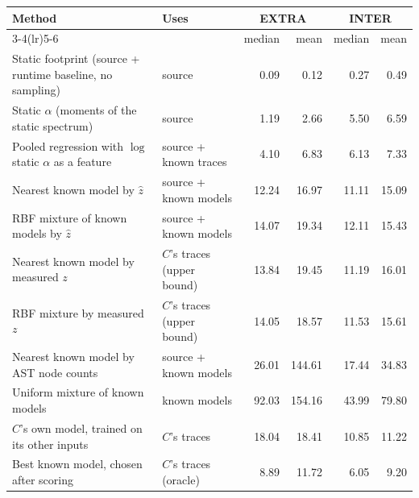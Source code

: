 \begin{tabular}{llrrrr}
\toprule
Method & Uses & \multicolumn{2}{c}{EXTRA} & \multicolumn{2}{c}{INTER} \\
\cmidrule(lr){3-4}\cmidrule(lr){5-6}
 & & median & mean & median & mean \\
\midrule
Static footprint (source + runtime baseline, no sampling) & source & 0.09 & 0.12 & 0.27 & 0.49 \\
Static $\alpha$ (moments of the static spectrum) & source & 1.19 & 2.66 & 5.50 & 6.59 \\
Pooled regression with $\log$ static $\alpha$ as a feature & source + known traces & 4.10 & 6.83 & 6.13 & 7.33 \\
\addlinespace
Nearest known model by $\hat z$ & source + known models & 12.24 & 16.97 & 11.11 & 15.09 \\
RBF mixture of known models by $\hat z$ & source + known models & 14.07 & 19.34 & 12.11 & 15.43 \\
Nearest known model by measured $z$ & $C$'s traces (upper bound) & 13.84 & 19.45 & 11.19 & 16.01 \\
RBF mixture by measured $z$ & $C$'s traces (upper bound) & 14.05 & 18.57 & 11.53 & 15.61 \\
Nearest known model by AST node counts & source + known models & 26.01 & 144.61 & 17.44 & 34.83 \\
\addlinespace
Uniform mixture of known models & known models & 92.03 & 154.16 & 43.99 & 79.80 \\
\addlinespace
$C$'s own model, trained on its other inputs & $C$'s traces & 18.04 & 18.41 & 10.85 & 11.22 \\
Best known model, chosen after scoring & $C$'s traces (oracle) & 8.89 & 11.72 & 6.05 & 9.20 \\
\bottomrule
\end{tabular}
